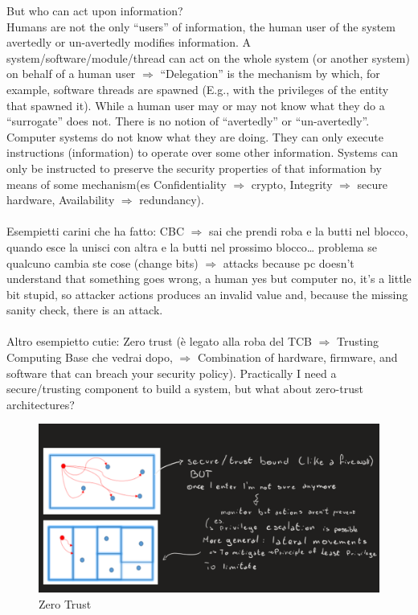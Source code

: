 But who can act upon information?
\\Humans are not the only “users” of information, the human user of the system avertedly or un-avertedly modifies information. A system/software/module/thread can act on the whole system (or another system) on behalf of a human user $\Rightarrow$ “Delegation” is the mechanism by which, for example, software threads are spawned (E.g., with the privileges of the entity that spawned it). While a human user may or may not know what they do a “surrogate” does not. There is no notion of “avertedly” or “un-avertedly”.
Computer systems do not know what they are doing. They can only execute instructions (information) to operate over some other information. Systems can only be instructed to preserve the security properties of that information by means of some mechanism(es Confidentiality $\Rightarrow$ crypto, Integrity $\Rightarrow$ secure hardware, Availability $\Rightarrow$ redundancy).
\\\\Esempietti carini che ha fatto: CBC $\Rightarrow$ sai che prendi roba e la butti nel blocco, quando esce la unisci con altra e la butti nel prossimo blocco… problema se qualcuno cambia ste cose (change bits) $\Rightarrow$ attacks because pc doesn’t understand that something goes wrong, a human yes but computer no, it’s a little bit stupid, so attacker actions produces an invalid value and, because the missing sanity check, there is an attack.
\\\\Altro esempietto cutie: Zero trust (è legato alla roba del TCB $\Rightarrow$ Trusting Computing Base che vedrai dopo, $\Rightarrow$ Combination of hardware, firmware, and software that can breach your security policy).
Practically I need a secure/trusting component to build a system, but what about zero-trust architectures?
\begin{figure}[h]
    \centering
    \includegraphics[scale=0.5]{Figures/ZeroTrust.png}
    \caption{Zero Trust}
\end{figure}
